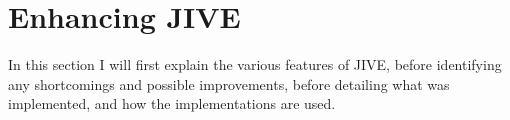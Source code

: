 \section{Enhancing JIVE}\label{enhJive}

In this section I will first explain the various features of JIVE, before identifying any shortcomings and possible improvements, before detailing what was implemented, and how the implementations are used.





